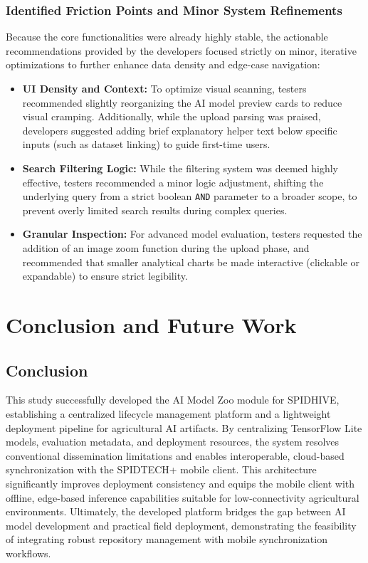 \documentclass[journal]{./IEEE/IEEEtran}
\begin{document}
\subsubsection{\textbf{Identified Friction Points and Minor System Refinements}}
Because the core functionalities were already highly stable, the actionable recommendations provided by the developers focused strictly on minor, iterative optimizations to further enhance data density and edge-case navigation:
\begin{itemize}
    \item \textbf{UI Density and Context:}
    To optimize visual scanning, testers recommended slightly reorganizing the AI model preview cards to reduce visual cramping. Additionally, while the upload parsing was praised, developers suggested adding brief explanatory helper text below specific inputs (such as dataset linking) to guide first-time users.
    \item \textbf{Search Filtering Logic:}
    While the filtering system was deemed highly effective, testers recommended a minor logic adjustment, shifting the underlying query from a strict boolean \texttt{AND} parameter to a broader scope, to prevent overly limited search results during complex queries.
    \item \textbf{Granular Inspection:}
    For advanced model evaluation, testers requested the addition of an image zoom function during the upload phase, and recommended that smaller analytical charts be made interactive (clickable or expandable) to ensure strict legibility.
\end{itemize}

\section{Conclusion and Future Work}

\subsection{Conclusion}
This study successfully developed the AI Model Zoo module for SPIDHIVE, establishing a centralized lifecycle management platform and a lightweight deployment pipeline for agricultural AI artifacts. By centralizing TensorFlow Lite models, evaluation metadata, and deployment resources, the system resolves conventional dissemination limitations and enables interoperable, cloud-based synchronization with the SPIDTECH+ mobile client. This architecture significantly improves deployment consistency and equips the mobile client with offline, edge-based inference capabilities suitable for low-connectivity agricultural environments. Ultimately, the developed platform bridges the gap between AI model development and practical field deployment, demonstrating the feasibility of integrating robust repository management with mobile synchronization workflows.
\end{document}
